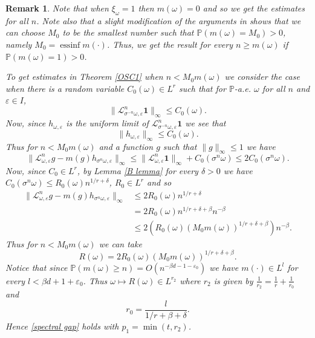 \documentclass[11pt,reqno,a4paper]{article}
\theoremstyle{special}
\newtheorem{remark}[theorem]{Remark}
\def\om{\omega}
\DeclareMathOperator{\essinf}{essinf}
\begin{document}
\begin{remark}\label{rem small n}
Note that when $\xi_\omega=1$ then $m(\om)=0$ and so we get the estimates for all $n$. Note also that a slight modification of the arguments in \cite{YH 23} shows that  we can choose $M_0$ to be the smallest number such that $\mathbb P(m(\om)=M_0)>0$, namely $M_0=\essinf m(\cdot)$. Thus, we get the result for every $n\geq m(\om)$ if $\mathbb P(m(\om)=1)>0$.

To get estimates in Theorem \ref{OSC1} when $n<M_0m(\omega)$ we consider the case when there is a random variable $C_0(\omega)\in L^{r}$ such that for $\mathbb P$-a.e. $\om$ for all $n$ and $\varepsilon\in I$,
$$
\|\mathcal L_{\sigma^{-n}\om,\varepsilon}^n\textbf{1}\|_\infty\leq C_0(\omega).
$$
Now, since $h_{\om,\varepsilon}$ is the uniform limit of $\mathcal L_{\sigma^{-n}\om,\varepsilon}^n\textbf{1}$ we see that 
$$
\|h_{\om,\varepsilon}\|_\infty\leq C_0(\omega).
$$
Thus for $n<M_0m(\omega)$ and a function $g$ such that $\|g\|_\infty\leq 1$ we have 
$$
\|\mathcal L_{\om,\varepsilon}^n g-m(g)h_{\sigma^n\omega,\varepsilon}\|_\infty\leq 
\|\mathcal L_{\om,\varepsilon}^n\textbf{1}\|_{\infty}+C_0(\sigma^n\omega)\leq 2C_0(\sigma^n\omega).
$$
Now, since $C_0\in L^{r}$, by Lemma \ref{B lemma} for every $\delta>0$ we have $C_0(\sigma^n\omega)\leq R_0(\omega)n^{1/r+\delta}$, $R_0\in L^r$ and so 
\[
\begin{split}
\|\mathcal L_{\om,\varepsilon}^n g-m(g)h_{\sigma^n\omega,\varepsilon}\|_\infty &\leq 
2R_0(\omega)n^{1/r+\delta}\\
&=2R_0(\omega)n^{1/r+\delta+\beta}n^{-\beta} \\
&\leq  2\left(R_0(\omega)(M_0m(\omega))^{1/r+\delta+\beta}\right)n^{-\beta}.
\end{split}
\]
Thus for $n<M_0m(\omega)$ we can take 
$$
R(\om)=2R_0(\omega)(M_0m(\omega))^{1/r+\delta+\beta}.
$$
Notice that since $\mathbb P(m(\om)\geq n)=O(n^{-\beta d-1-\varepsilon_0})$ we have $m(\cdot)\in L^l$ for every $l<\beta d+1+\varepsilon_0$. Thus $\om\mapsto R(\om)\in L^{r_2}$ where $r_2$ is given by $\frac1{r_2}=\frac{1}r+\frac{1}{r_0}$ and
\begin{equation}\label{r 0 form}
r_0=\frac{l}{1/r+\beta+\delta}.    
\end{equation} 
Hence \eqref{spectral gap} holds with $p_1=\min(t, r_2)$.
\end{remark}
\end{document}
